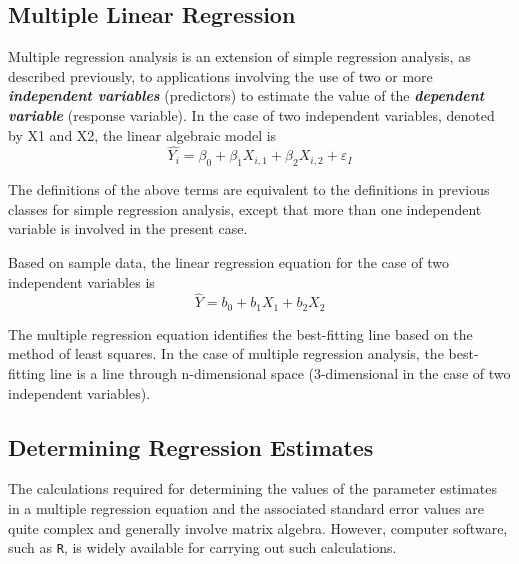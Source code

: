 \documentclass[12pt]{article}
\begin{document}
\subsection*{Multiple Linear Regression}


Multiple regression analysis is an extension of simple regression analysis, as described previously, to applications involving the use of two or more \textbf{\textit{independent variables}} (predictors) to estimate the value of the \textbf{\textit{dependent variable}} (response variable).
In the case of two independent variables, denoted by X1 and X2, the linear algebraic model is
\[ \hat{Y_i} = \beta_0 + \beta_1X_{i,1} + \beta_2X_{i,2} +\varepsilon_I\]

The definitions of the above terms are equivalent to the definitions in previous classes for simple regression analysis, except that more than one independent variable is involved in the present case.

Based on sample data, the linear regression equation for the case of two independent variables is
\[ \hat{Y} = b_0 + b_1X_1 + b_2X_2 \]

The multiple regression equation identifies the best-fitting line based on the method of least squares. In the case of multiple regression analysis, the best-fitting line is a line through
n-dimensional space (3-dimensional in the case of two independent variables).

\subsection*{Determining Regression Estimates}

The calculations required for determining the values of the parameter estimates in a multiple regression equation and the associated standard error values are quite complex and generally involve matrix algebra. However, computer software, such as \texttt{R}, is widely available for carrying out such calculations.
\end{document}
